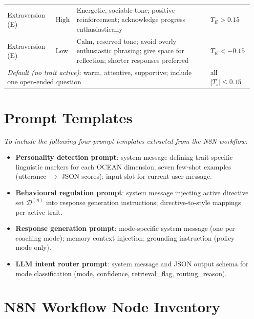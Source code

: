 \documentclass[10pt,a4paper]{report}
\begin{document}
\begin{table}[H]
\begin{tabularx}{\textwidth}{@{}llXl@{}}
Extraversion (E) & High & Energetic, sociable tone; positive reinforcement; acknowledge progress enthusiastically & $T_E > 0.15$ \\
Extraversion (E) & Low & Calm, reserved tone; avoid overly enthusiastic phrasing; give space for reflection; shorter responses preferred & $T_E < -0.15$ \\
\midrule
\multicolumn{3}{l}{\textit{Default (no trait active)}: warm, attentive, supportive; include one open-ended question} & all $|T_i| \leq 0.15$ \\
\bottomrule
\end{tabularx}
\end{table}

\chapter{Prompt Templates}
\label{app:prompts}

\begin{tcolorbox}[colback=gray!6!white, colframe=gray!50!black, title=\textbf{Placeholder --- Prompt Templates}, left=4pt, right=4pt]
\textit{To include the following four prompt templates extracted from the N8N workflow:}
\begin{itemize}[nosep]
  \item \textbf{Personality detection prompt}: system message defining trait-specific linguistic markers for each OCEAN dimension; seven few-shot examples (utterance $\to$ JSON scores); input slot for current user message.
  \item \textbf{Behavioural regulation prompt}: system message injecting active directive set $\mathcal{D}^{(n)}$ into response generation instructions; directive-to-style mappings per active trait.
  \item \textbf{Response generation prompt}: mode-specific system message (one per coaching mode); memory context injection; grounding instruction (policy mode only).
  \item \textbf{LLM intent router prompt}: system message and JSON output schema for mode classification (mode, confidence, retrieval\_flag, routing\_reason).
\end{itemize}
\end{tcolorbox}

\chapter{N8N Workflow Node Inventory}
\label{app:workflow}
\end{document}
